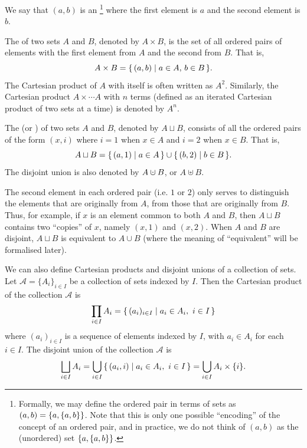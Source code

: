 We say that $(a, b)$ is an \footnote{Formally, we may define the ordered pair in terms of sets as $(a, b) = \qty{a, \qty{a, b}}$. Note that this is only one possible ``encoding'' of the concept of an ordered pair, and in practice, we do not think of $(a, b)$ as the (unordered) set $\qty{a, \qty{a, b}}$.} where the first element is $a$ and the second element is $b$.

The  of two sets $A$ and $B$, denoted by $A \times B$, is the set of all ordered pairs of elements with the first element from $A$ and the second from $B$. That is,
\begin{equation*}
A \times B = \qty{\, (a, b) \mid a \in A,\, b \in B \,}.
\end{equation*}
The Cartesian product of $A$ with itself is often written as $A^2$. Similarly, the Cartesian product $A \times \cdots A$ with $n$ terms (defined as an iterated Cartesian product of two sets at a time) is denoted by $A^n$. 

The  (or ) of two sets $A$ and $B$, denoted by $A \sqcup B$, consists of all the ordered pairs of the form $(x, i)$ where $i = 1$ when $x \in A$ and $i = 2$ when $x \in B$. That is,
\begin{equation*}
A \sqcup B = \qty{\, (a, 1) \mid a \in A \,} \cup \qty{\, (b, 2) \mid b \in B \,}.
\end{equation*}
The disjoint union is also denoted by $A \mathbin{\mathaccent\cdot\cup} B$, or $A \uplus B$.

\begin{Note*}
The second element in each ordered pair (i.e. $1$ or $2$) only serves to distinguish the elements that are originally from $A$, from those that are originally from $B$. Thus, for example, if $x$ is an element common to both $A$ and $B$, then $A \sqcup B$ contains two ``copies'' of $x$, namely $(x, 1)$ and $(x, 2)$. When $A$ and $B$ are disjoint, $A \sqcup B$ is equivalent to $A \cup B$ (where the meaning of ``equivalent'' will be formalised later).
\end{Note*}

We can also define Cartesian products and disjoint unions of a collection of sets. Let $\mathcal A = \{A_i\}_{i \in I}$ be a collection of sets indexed by $I$. Then the Cartesian product of the collection $\mathcal A$ is
\begin{equation*}
\prod_{i \in I} A_i = \qty{\, (a_i)_{i \in I} \mid a_i \in A_i,~ i \in I \,}
\end{equation*}
where $(a_i)_{i \in I}$ is a sequence of elements indexed by $I$, with $a_i \in A_i$ for each $i \in I$. The disjoint union of the collection $\mathcal A$ is
\begin{equation*}
\bigsqcup_{i \in I} A_i = \bigcup_{i \in I} \qty{\, (a_i, i) \mid a_i \in A_i,~ i \in I \,} = \bigcup_{i \in I} A_i \times \{i\}.
\end{equation*}

